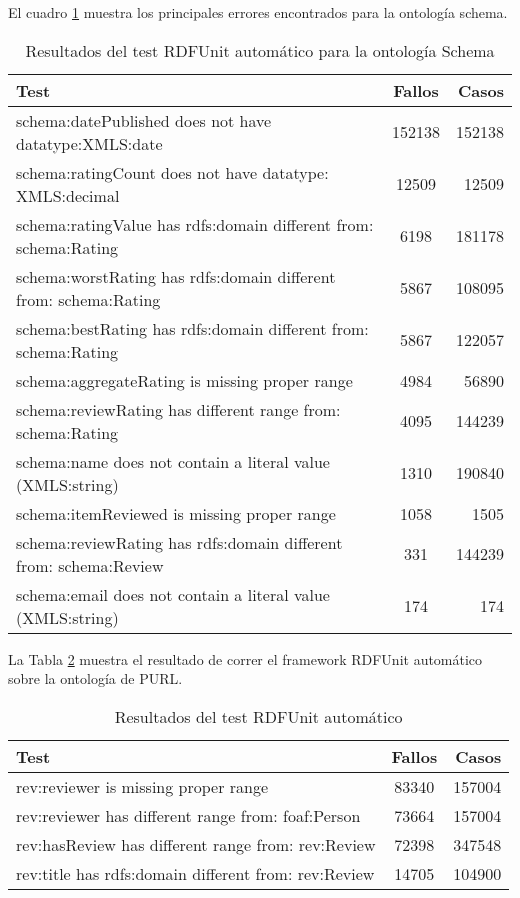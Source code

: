 El cuadro \ref{table:RDFUnitSchemaAutomatic} muestra los principales errores encontrados para la ontología schema.
\begin{table}[h]
\begin{tabular}{| l | c | r | }\hline
Test & Fallos & Casos \\\hline
 schema:datePublished does not have datatype:XMLS:date & 152138 & 152138\\
 schema:ratingCount does not have datatype: XMLS:decimal & 12509 & 12509\\
 schema:ratingValue has rdfs:domain different from: schema:Rating & 6198 & 181178\\
 schema:worstRating has rdfs:domain different from: schema:Rating & 5867 & 108095\\
 schema:bestRating has rdfs:domain different from: schema:Rating & 5867 & 122057\\
 schema:aggregateRating is missing proper range & 4984 & 56890\\
 schema:reviewRating has different range from: schema:Rating & 4095 & 144239\\
 schema:name does not contain a literal value (XMLS:string) & 1310 & 190840\\
 schema:itemReviewed is missing proper range & 1058 & 1505\\
 schema:reviewRating has rdfs:domain different from: schema:Review & 331 & 144239\\
 schema:email does not contain a literal value (XMLS:string) & 174  & 174 \\ \hline
\end{tabular}
\caption{Resultados del test RDFUnit automático para la ontología Schema}
\label{table:RDFUnitSchemaAutomatic}
\end{table}

La Tabla \ref{table:RDFUnitPurlAutomatic} muestra el resultado de correr el framework RDFUnit automático sobre la ontología de PURL.
\begin{table}[h]
\begin{tabular}{| l | c | r | }\hline
Test & Fallos & Casos \\\hline
 rev:reviewer is missing proper range & 83340 & 157004\\
 rev:reviewer has different range from: foaf:Person & 73664 & 157004\\
 rev:hasReview has different range from: rev:Review & 72398 & 347548\\
 rev:title has rdfs:domain different from: rev:Review & 14705 & 104900 \\ \hline
\end{tabular}
\caption{Resultados del test RDFUnit automático}
\label{table:RDFUnitPurlAutomatic}
\end{table}

